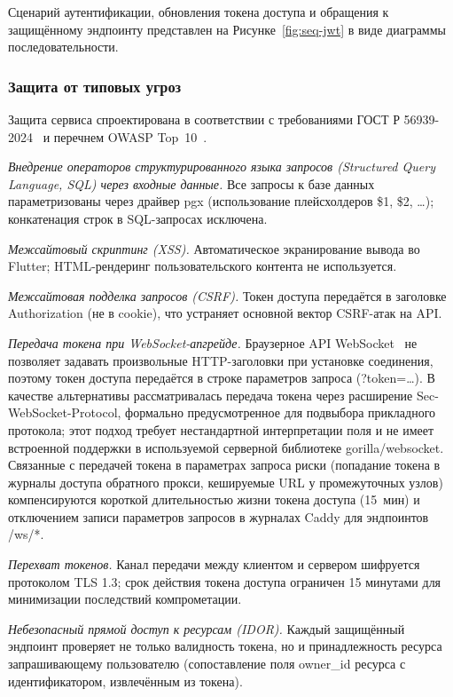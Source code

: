 Сценарий аутентификации, обновления токена доступа и обращения
к защищённому эндпоинту представлен на Рисунке~\ref{fig:seq-jwt}
в виде диаграммы последовательности.


\subsubsection{Защита от типовых угроз}

Защита сервиса спроектирована в соответствии с требованиями
ГОСТ Р 56939-2024~\cite{gost56939} и перечнем OWASP
Top~10~\cite{owasp_top10}.

\emph{Внедрение операторов структурированного языка запросов
(Structured Query Language, SQL) через входные данные.} Все запросы
к базе данных параметризованы через драйвер pgx (использование
плейсхолдеров \$1, \$2, \dots); конкатенация строк в SQL-запросах
исключена.

\emph{Межсайтовый скриптинг (XSS).} Автоматическое экранирование
вывода во Flutter; HTML-рендеринг пользовательского контента
не используется.

\emph{Межсайтовая подделка запросов (CSRF).} Токен доступа
передаётся в заголовке Authorization (не в cookie),
что устраняет основной вектор CSRF-атак на API.

\emph{Передача токена при WebSocket-апгрейде.} Браузерное API
WebSocket~\cite{rfc6455} не позволяет задавать произвольные
HTTP-заголовки при установке соединения, поэтому токен доступа
передаётся в строке параметров запроса (?token=\dots).
В качестве альтернативы рассматривалась передача токена через
расширение
Sec-WebSocket-Protocol, формально предусмотренное
для подвыбора прикладного протокола; этот подход требует
нестандартной интерпретации поля и не имеет встроенной поддержки
в используемой серверной библиотеке gorilla/websocket. Связанные
с передачей токена в параметрах запроса риски (попадание токена
в журналы доступа обратного прокси, кешируемые URL у промежуточных
узлов) компенсируются короткой длительностью жизни токена доступа
(15~мин) и отключением записи параметров запросов в журналах Caddy
для эндпоинтов /ws/*.

\emph{Перехват токенов.} Канал передачи между клиентом и сервером
шифруется протоколом TLS 1.3; срок действия токена доступа ограничен
15 минутами для минимизации последствий компрометации.

\emph{Небезопасный прямой доступ к ресурсам (IDOR).} Каждый
защищённый эндпоинт проверяет не только валидность токена,
но и принадлежность ресурса запрашивающему пользователю
(сопоставление поля owner\_id ресурса с идентификатором,
извлечённым из токена).

